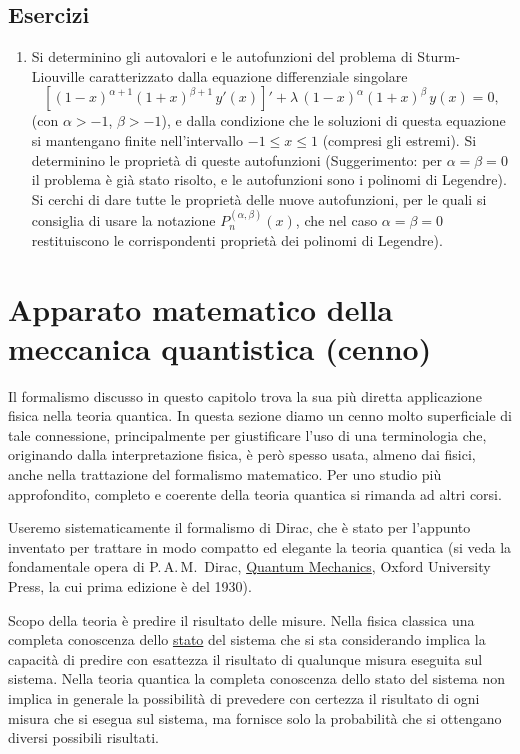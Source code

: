 \documentclass[11pt, a4paper]{book}
\numberwithin{equation}{section}
\newenvironment{esercizi}{\subsection*{Esercizi}\begin{enumerate}}{\end{enumerate}}
\begin{document}
\begin{esercizi}
\begin{enumerate}
\item[*] Si determinino gli autovalori e le autofunzioni del problema di Sturm-Liouville caratterizzato dalla equazione differenziale singolare
\[
\left[(1-x)^{\alpha+1}(1+x)^{\beta+1}\,y'(x)\right]' + \lambda\,(1-x)^{\alpha}(1+x)^{\beta}\,y(x) = 0,
\]
(con $\alpha>-1$, $\beta>-1$), e dalla condizione che le soluzioni di questa equazione si mantengano finite nell'intervallo $-1\le x\le 1$ (compresi gli estremi). Si determinino le proprietà di queste autofunzioni (Suggerimento: per $\alpha=\beta=0$ il problema è già stato risolto, e le autofunzioni sono i polinomi di Legendre). Si cerchi di dare tutte le proprietà delle nuove autofunzioni, per le quali si consiglia di usare la notazione $P_n^{(\alpha,\beta)}(x)$, che nel caso $\alpha=\beta=0$ restituiscono le corrispondenti proprietà dei polinomi di Legendre).
\end{enumerate}

\end{esercizi}

\section{Apparato matematico della meccanica quantistica (cenno)}

Il formalismo discusso in questo capitolo trova la sua più diretta applicazione fisica nella teoria quantica. In questa sezione diamo un cenno molto superficiale di tale connessione, principalmente per giustificare l'uso di una terminologia che, originando dalla interpretazione fisica, è però spesso usata, almeno dai fisici, anche nella trattazione del formalismo matematico. Per uno studio più approfondito, completo e coerente della teoria quantica si rimanda ad altri corsi.

Useremo sistematicamente il formalismo di Dirac, che è stato per l'appunto inventato per trattare in modo compatto ed elegante la teoria quantica (si veda la fondamentale opera di P.\,A.\,M.\ Dirac, \uline{Quantum Mechanics}, Oxford University Press, la cui prima edizione è del 1930).

Scopo della teoria è predire il risultato delle misure. Nella fisica classica una completa conoscenza dello \uline{stato} del sistema che si sta considerando implica la capacità di predire con esattezza il risultato di qualunque misura eseguita sul sistema. Nella teoria quantica la completa conoscenza dello stato del sistema non implica in generale la possibilità di prevedere con certezza il risultato di ogni misura che si esegua sul sistema, ma fornisce solo la probabilità che si ottengano diversi possibili risultati.
\end{document}
